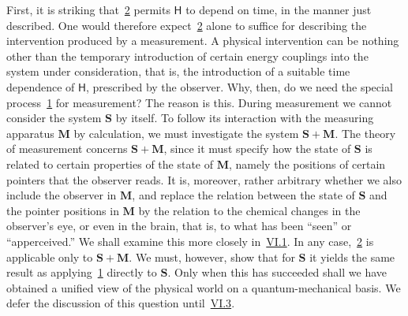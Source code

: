 \documentclass[fontsize=13pt,twoside,openany,headings=normal,parskip=false,bookmarkpackage=false,DIV=calc]{scrbook}
\begin{document}
First, it is striking that~\hyperref[eq:V.1.2]{2} permits $\mathsf{H}$ to depend on time, in the manner just described. One would therefore expect~\hyperref[eq:V.1.2]{2} alone to suffice for describing the intervention produced by a measurement. A physical intervention can be nothing other than the temporary introduction of certain energy couplings into the system under consideration, that is, the introduction of a suitable time dependence of $\mathsf{H}$, prescribed by the observer. Why, then, do we need the special process~\hyperref[eq:V.1.1]{1} for measurement? The reason is this. During measurement we cannot consider the system $\boldsymbol{S}$ by itself. To follow its interaction with the measuring apparatus $\boldsymbol{M}$ by calculation, we must investigate the system $\boldsymbol{S}+\boldsymbol{M}$. The theory of measurement concerns $\boldsymbol{S}+\boldsymbol{M}$, since it must specify how the state of $\boldsymbol{S}$ is related to certain properties of the state of $\boldsymbol{M}$, namely the positions of certain pointers that the observer reads. It is, moreover, rather arbitrary whether we also include the observer in $\boldsymbol{M}$, and replace the relation between the state of $\boldsymbol{S}$ and the pointer positions in $\boldsymbol{M}$ by the relation to the chemical changes in the observer's eye, or even in the brain, that is, to what has been ``seen'' or ``apperceived.'' We shall examine this more closely in~\hyperref[sec:VI.1]{VI.1}. In any case,~\hyperref[eq:V.1.2]{2} is applicable only to $\boldsymbol{S}+\boldsymbol{M}$. We must, however, show that for $\boldsymbol{S}$ it yields the same result as applying~\hyperref[eq:V.1.1]{1} directly to $\boldsymbol{S}$. Only when this has succeeded shall we have obtained a unified view of the physical world on a quantum-mechanical basis. We defer the discussion of this question until~\hyperref[sec:VI.3]{VI.3}.
\end{document}
